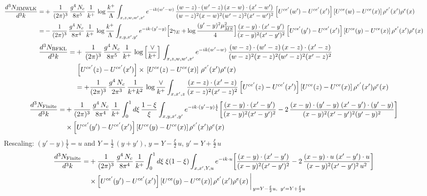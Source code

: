 \documentclass[9pt]{article}
\numberwithin{equation}{section}
\begin{document}
\begin{align}
\frac{d^{3}N_{\rm JIMWLK}}{d^{3}k}= & +\,\frac{1}{(2\pi)^{3}}\,\frac{g^{4}\,N_{c}}{8\pi^{5}}\,\frac{1}{k^{+}}\,\log\frac{k^{+}}{\Lambda}\int_{x,z,w,w',x'}e^{-ik(w'-w)}\,\frac{(w-z)\cdot (w'-z)\,(x-w)\cdot (x'-w')}{(w-z)^{2}(x-w)^{2}(w'-z)^{2}(x'-w')^{2}}\left[U^{ce'}(w') - U^{ce'}(x')\right]\left[U^{ce}(w) - U^{ce}(x)\right]\rho^{e'}(x') \rho^{e}(x)\notag \\
= & -\frac{1}{(2\pi)^{3}}\,\frac{g^{4}\,N_{c}}{8\pi^{4}}\,\frac{1}{k^{+}}\,\log\frac{k^{+}}{\Lambda}\int_{x,y,x',y'}e^{-ik\cdot(y'-y)}\Big[2\gamma_{E}+\log\frac{(y'-y)^{2}\mu^{2}_{\overline{MS}}}{4}\Big]\frac{(x-y)\cdot(x'-y')}{(x-y)^{2}(x'-y')^{2}}\left[U^{ce'}(y') - U^{ce'}(x')\right]\left[U^{ce}(y) - U^{ce}(x)\right]\rho^{e'}(x')\rho^{e}(x)
\end{align}
\begin{align}
\frac{d^{3}N_{\rm BFKL}}{d^{3}k}= &    +\,\frac{1}{(2\pi)^{3}}\,\frac{g^{4}\,N_{c}}{8\pi^{5}}\,\frac{1}{k^{+}}\,\log{\left[\frac{\vee}{k^{+}}\right]}\,\int_{x,z,w,w',x'}e^{-ik(w'-w)}\,\frac{(w-z)\cdot (w'-z)\,(x-z)\cdot (x'-z)}{(w-z)^{2}(x-z)^{2}(w'-z)^{2}(x'-z)^{2}}\notag\\ & \, \left[U^{ce'}(z) - U^{ce'}(x')\right] \times\, \left[U^{ce}(z) - U^{ce}(x)\right]\, \rho^{e'}(x') \rho^{e}(x)\notag \\ & = +\frac{1}{(2\pi)^{3}}\,\frac{g^{4}\,N_{c}}{2\pi^{3}}\,\frac{1}{k^{+}k^{2}}\,\log\frac{\vee}{k^{+}}\int_{x,x',z}\frac{(x-z)\cdot(x'-z)}{(x-z)^{2}(x'-z)^{2}}\left[U^{ce'}(z) - U^{ce'}(x')\right]\left[U^{ce}(z) - U^{ce}(x)\right]\rho^{e'}(x')\rho^{e}(x)
\end{align}
\begin{align}
\frac{d^{3}N_{\rm Finite}}{d^{3}k}= &  +\frac{1}{(2\pi)^{3}}\,\frac{g^{4}\,N_{c}}{8\pi^{4}}\,\frac{1}{k^{+}}\int_{0}^{1}d\xi\,\frac{1-\xi}{\xi}\int_{x,y,x',y'}e^{-ik\cdot(y'-y)\frac{1}{\xi}}\bigg[\frac{(x-y)\cdot(x'-y')}{(x-y)^{2}(x'-y')^{2}}-2\,\frac{(x-y)\cdot(y'-y)\;(x'-y')\cdot(y'-y)}{(x-y)^{2}(x'-y')^{2}(y'-y)^{2}}\bigg]\notag\\
&\times\left[U^{ce'}(y') - U^{ce'}(x')\right]\left[U^{ce}(y) - U^{ce}(x)\right]\rho^{e'}(x')\rho^{e}(x)
\end{align}
Rescaling: $ (y'-y)\frac{1}{\xi} = u$ and $Y = \frac{1}{2}\, (y+y')$, $y = Y - \frac{\xi}{2}\,u$, $y' = Y +\frac{\xi}{2}\,u$
\begin{align}
\frac{d^{3}N_{\rm Finite}}{d^{3}k}= &  +\frac{1}{(2\pi)^{3}}\,\frac{g^{4}\,N_{c}}{8\pi^{4}}\,\frac{1}{k^{+}}\int_{0}^{1}d\xi\;\xi(1-\xi)\int_{x,x',Y,u}e^{-ik\cdot u}\bigg[\frac{(x-y)\cdot(x'-y')}{(x-y)^{2}(x'-y')^{2}}-2\,\frac{(x-y)\cdot u\;(x'-y')\cdot u}{(x-y)^{2}(x'-y')^{2}\,u^{2}}\bigg]\notag\\
&\times\left[U^{ce'}(y') - U^{ce'}(x')\right]\left[U^{ce}(y) - U^{ce}(x)\right]\rho^{e'}(x')\rho^{e}(x)\,\bigg|_{\,y=Y-\frac{\xi}{2}u,\;\;y'=Y+\frac{\xi}{2}u}
\end{align}
\end{document}
